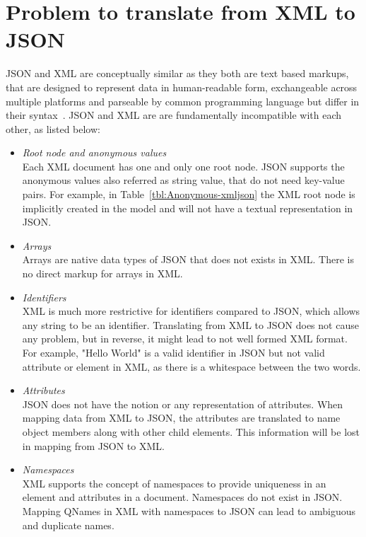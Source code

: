 \section{Problem to translate from XML to JSON}
JSON and XML are conceptually similar as they both are text based markups, that are designed to represent data in human-readable form, exchangeable across multiple platforms and parseable by common programming language but differ in their syntax~\citep{lee2011jxon}. JSON and XML are are fundamentally incompatible with each other, as listed below:
\begin{itemize}
\item \textit{Root node and anonymous values}
\\
Each XML document has one and only one root node. JSON supports the anonymous values also referred as string value, that do not need key-value pairs. For example, in Table~\ref{tbl:Anonymous-xmljson} the XML root node is implicitly created in the model and will not have a textual representation in JSON.

	\item \textit{Arrays}\\
		Arrays are native data types of JSON that does not exists in XML. There is no direct markup for arrays in XML.
		\item \textit{Identifiers}\\
		XML is much more restrictive for identifiers compared to JSON, which allows any string to be an identifier. Translating from XML to JSON does not cause any problem, but in reverse, it might lead to not well formed XML format. For example, "Hello World" is a valid identifier in JSON but not valid attribute or element in XML, as there is a whitespace between the two words.
		\item \textit{Attributes}\\
		JSON does not have the notion or any representation of attributes. When mapping data from XML to JSON, the attributes are translated to name object members along with other child elements. This information will be lost in mapping from JSON to XML.
		\item \textit{Namespaces}\\
		XML supports the concept of namespaces to provide uniqueness in an element and attributes in a document. Namespaces do not exist in JSON. Mapping QNames in XML with namespaces to JSON can lead to ambiguous and duplicate names.
\end{itemize}

